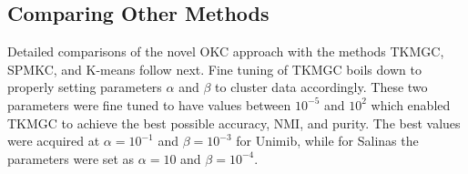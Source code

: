 \documentclass[10pt,final]{IEEEtran}
\begin{document}
\subsection{Comparing Other Methods}
Detailed comparisons of the novel OKC approach  with the methods TKMGC, SPMKC, and K-means follow next. %
Fine tuning of TKMGC boils down to properly setting parameters \begin{math}\alpha\end{math} and \begin{math}\beta\end{math} to cluster data accordingly. These two parameters  were fine tuned to have values between \begin{math}10^{-5}\end{math} and \begin{math}10^2\end{math} which enabled TKMGC to achieve the best possible  accuracy, NMI, and purity. The best values were acquired at \begin{math}\alpha=10^{-1}\end{math} and \begin{math}\beta=10^{-3}\end{math} for Unimib, while for Salinas the parameters were set as \begin{math}\alpha=10\end{math} and \begin{math}\beta=10^{-4}\end{math}. 
\end{document}
